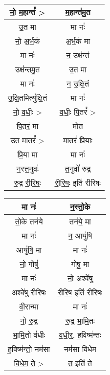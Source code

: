 {\centering
\begin{longtable}{|c|c|}
\hline
नो॒ म॒हान्तं᳚ >                   & म॒हान्त॑मु॒त\\
\hline
उ॒त मा                        & मा नः॑\\
\hline
नो॒ अ॒र्भ॒कं                      & अ॒र्भ॒कं मा\\
\hline
मा नः॑                        & न॒ उक्ष॑न्तं\\
\hline
उक्ष॑न्तमु॒त                      & उ॒त मा\\
\hline
मा नः॑                        & न॒ उ॒क्षि॒तं\\
\hline
उ॒क्षि॒तमित्यु॑क्षि॒तं                & मा नः॑\\
\hline
नो॒ व॒धीः॒ >                    & व॒धीः॒ पि॒तरं᳚ >\\
\hline
पि॒तरं॒ मा                      & मोत\\
\hline
उ॒त मा॒तरं᳚ >                    & मा॒तरं॑ प्रि॒याः\\
\hline
प्रि॒या मा                     & मा नः॑\\
\hline
न॒स्त॒नुवः॑                       & त॒नुवो॑ रुद्र\\
\hline
रु॒द्र॒ री॒रि॒षः॒                   & री॒रि॒षः॒ इति॑ रीरिषः\\
\hline
\end{longtable}
}
{\centering
\begin{longtable}{|c|c|}
\hline
मा नः॑                        & न॒स्तो॒के\\
\hline
तो॒के तन॑ये                      & तन॑ये॒ मा\\
\hline
मा नः॑                        & न॒ आयु॑षि\\
\hline
आयु॑षि॒ मा                      & मा नः॑\\
\hline
नो॒ गोषु॑                       & गोषु॒ मा\\
\hline
मा नः॑                        & नो॒ अश्वे॑षु\\
\hline
अश्वे॑षु रीरिषः                  & री॒रि॒ष॒ इति॑ रीरिषः\\
\hline
वी॒रान्मा                      & मा नः॑\\
\hline
नो॒ रु॒द्र॒                       & रु॒द्र॒ भा॒मि॒तः\\
\hline
भा॒मि॒तो व॑धीः                  & व॒धी॒र्॒. ह॒विष्म॑न्तः\\
\hline
ह॒विष्म॑न्तो॒ नम॑सा                & नम॑सा विधेम\\
\hline
वि॒धे॒म॒ ते॒ >                     & त॒ इति॑ ते\\
\hline
\end{longtable}
}
